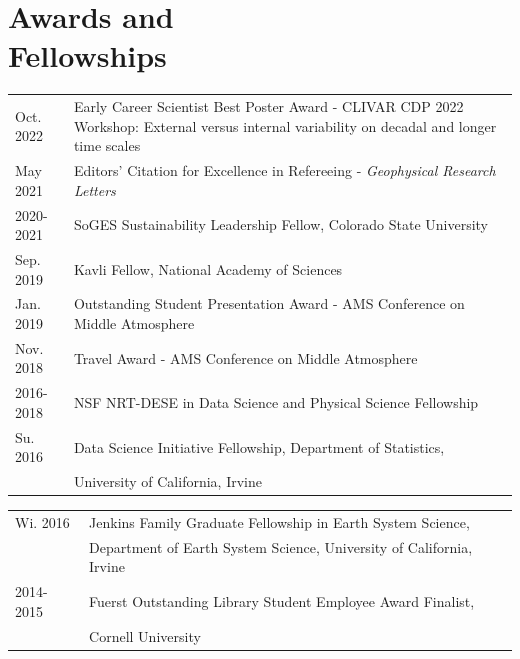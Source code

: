 \documentclass[margin,line,palatino,courier,10pt]{res}
\begin{document}
\begin{resume}
\begin{etaremune}[leftmargin=0in,topsep=0in,parsep=0in]
\end{etaremune}

\vspace{-0.1in}
\noindent\textcolor{Cerulean}{\makebox[\linewidth][r]{\rule{\textwidth}{5pt}}}
\vspace{-0.3in}

\section{\sc \textcolor{Cerulean}{\large{\textbf{Awards and\\ Fellowships}}}}
\begin{tabular}{@{}p{0.9in}p{4in}}
Oct. 2022 & Early Career Scientist Best Poster Award - CLIVAR CDP 2022 Workshop: External versus internal variability on decadal and longer time scales\\
May 2021 & Editors' Citation for Excellence in Refereeing - \textit{Geophysical Research Letters}\\
2020-2021 & SoGES Sustainability Leadership Fellow, Colorado State University\\
Sep. 2019 & Kavli Fellow, National Academy of Sciences\\
Jan. 2019 & Outstanding Student Presentation Award - AMS Conference on Middle Atmosphere\\
Nov. 2018 & Travel Award - AMS Conference on Middle Atmosphere\\
2016-2018 & NSF NRT-DESE in Data Science and Physical Science Fellowship\\
Su. 2016 & Data Science Initiative Fellowship, Department of Statistics, \\
& University of California, Irvine\\
\end{tabular}
\begin{tabular}{@{}p{0.9in}p{4in}}
Wi. 2016 & Jenkins Family Graduate Fellowship in Earth System Science,\\ 
& Department of Earth System
Science, University of California, Irvine\\
2014-2015 & Fuerst Outstanding Library Student Employee Award Finalist,\\
& Cornell University
\end{tabular}



\end{resume}
\end{document}
